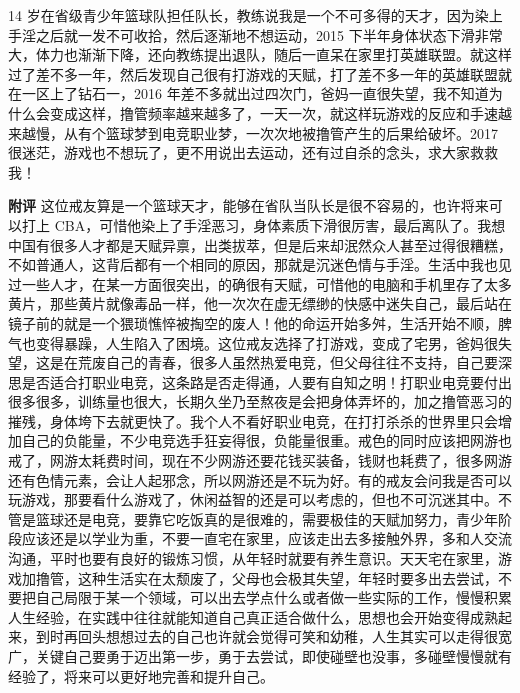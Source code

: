 \begin{case}
\end{case}

\begin{case}
    14 岁在省级青少年篮球队担任队长，教练说我是一个不可多得的天才，因为染上手淫之后就一发不可收拾，然后逐渐地不想运动，2015 下半年身体状态下滑非常大，体力也渐渐下降，还向教练提出退队，随后一直呆在家里打英雄联盟。就这样过了差不多一年，然后发现自己很有打游戏的天赋，打了差不多一年的英雄联盟就在一区上了钻石一，2016 年差不多就出过四次门，爸妈一直很失望，我不知道为什么会变成这样，撸管频率越来越多了，一天一次，就这样玩游戏的反应和手速越来越慢，从有个篮球梦到电竞职业梦，一次次地被撸管产生的后果给破坏。2017 很迷茫，游戏也不想玩了，更不用说出去运动，还有过自杀的念头，求大家救救我！

    \textbf{附评} 这位戒友算是一个篮球天才，能够在省队当队长是很不容易的，也许将来可以打上 CBA，可惜他染上了手淫恶习，身体素质下滑很厉害，最后离队了。我想中国有很多人才都是天赋异禀，出类拔萃，但是后来却泯然众人甚至过得很糟糕，不如普通人，这背后都有一个相同的原因，那就是沉迷色情与手淫。生活中我也见过一些人才，在某一方面很突出，的确很有天赋，可惜他的电脑和手机里存了太多黄片，那些黄片就像毒品一样，他一次次在虚无缥缈的快感中迷失自己，最后站在镜子前的就是一个猥琐憔悴被掏空的废人！他的命运开始多舛，生活开始不顺，脾气也变得暴躁，人生陷入了困境。这位戒友选择了打游戏，变成了宅男，爸妈很失望，这是在荒废自己的青春，很多人虽然热爱电竞，但父母往往不支持，自己要深思是否适合打职业电竞，这条路是否走得通，人要有自知之明！打职业电竞要付出很多很多，训练量也很大，长期久坐乃至熬夜是会把身体弄坏的，加之撸管恶习的摧残，身体垮下去就更快了。我个人不看好职业电竞，在打打杀杀的世界里只会增加自己的负能量，不少电竞选手狂妄得很，负能量很重。戒色的同时应该把网游也戒了，网游太耗费时间，现在不少网游还要花钱买装备，钱财也耗费了，很多网游还有色情元素，会让人起邪念，所以网游还是不玩为好。有的戒友会问我是否可以玩游戏，那要看什么游戏了，休闲益智的还是可以考虑的，但也不可沉迷其中。不管是篮球还是电竞，要靠它吃饭真的是很难的，需要极佳的天赋加努力，青少年阶段应该还是以学业为重，不要一直宅在家里，应该走出去多接触外界，多和人交流沟通，平时也要有良好的锻炼习惯，从年轻时就要有养生意识。天天宅在家里，游戏加撸管，这种生活实在太颓废了，父母也会极其失望，年轻时要多出去尝试，不要把自己局限于某一个领域，可以出去学点什么或者做一些实际的工作，慢慢积累人生经验，在实践中往往就能知道自己真正适合做什么，思想也会开始变得成熟起来，到时再回头想想过去的自己也许就会觉得可笑和幼稚，人生其实可以走得很宽广，关键自己要勇于迈出第一步，勇于去尝试，即使碰壁也没事，多碰壁慢慢就有经验了，将来可以更好地完善和提升自己。
\end{case}

